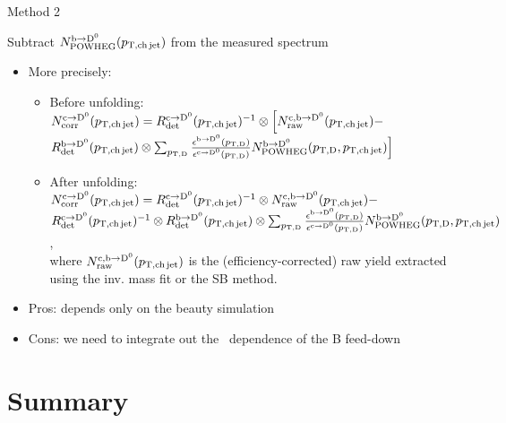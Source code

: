 \documentclass[xcolor={usenames,dvipsnames}]{beamer}
\begin{document}
\begin{frame}{Method 2}
\begin{center}
Subtract $N^{\rm b\rightarrow\mathrm{D^{0}}}_{\rm POWHEG}(p_{\mathrm{T,ch\, jet}})$ from the measured spectrum
\end{center}
\footnotesize
\begin{itemize}
\item More precisely:
\begin{itemize}
\item Before unfolding: \\
$N^{\rm c\rightarrow\mathrm{D^{0}}}_{\rm corr}(p_{\mathrm{T,ch\, jet}}) = R_{\rm det}^{\rm c\rightarrow\mathrm{D^{0}}}(p_{\mathrm{T,ch\, jet}})^{-1} \otimes \Big[N^{\rm c,b\rightarrow\mathrm{D^{0}}}_{\rm raw}(p_{\mathrm{T,ch\, jet}}) - $\\
$R_{\rm det}^{\rm b\rightarrow\mathrm{D^{0}}}(p_{\mathrm{T,ch\, jet}}) \otimes \sum_{p_{\mathrm{T,D}}} \frac{\epsilon^{\rm b\rightarrow\mathrm{D^{0}}}(p_{\mathrm{T,D}})}{\epsilon^{\rm c\rightarrow\mathrm{D^{0}}}(p_{\mathrm{T,D}})} N^{\rm b\rightarrow\mathrm{D^{0}}}_{\rm POWHEG}(p_{\mathrm{T,D}},p_{\mathrm{T,ch\, jet}})\Big]$
\item After unfolding: \\
$N^{\rm c\rightarrow\mathrm{D^{0}}}_{\rm corr}(p_{\mathrm{T,ch\, jet}}) = R_{\rm det}^{\rm c\rightarrow\mathrm{D^{0}}}(p_{\mathrm{T,ch\, jet}})^{-1} \otimes N^{\rm c,b\rightarrow\mathrm{D^{0}}}_{\rm raw}(p_{\mathrm{T,ch\, jet}}) - $ \\ 
$R_{\rm det}^{\rm c\rightarrow\mathrm{D^{0}}}(p_{\mathrm{T,ch\, jet}})^{-1} \otimes R_{\rm det}^{\rm b\rightarrow\mathrm{D^{0}}}(p_{\mathrm{T,ch\, jet}}) \otimes \sum_{p_{\mathrm{T,D}}} \frac{\epsilon^{\rm b\rightarrow\mathrm{D^{0}}}(p_{\mathrm{T,D}})}{\epsilon^{\rm c\rightarrow\mathrm{D^{0}}}(p_{\mathrm{T,D}})} N^{\rm b\rightarrow\mathrm{D^{0}}}_{\rm POWHEG}(p_{\mathrm{T,D}},p_{\mathrm{T,ch\, jet}})$, \\
where $N^{\rm c,b\rightarrow\mathrm{D^{0}}}_{\rm raw}(p_{\mathrm{T,ch\, jet}})$ is the (efficiency-corrected) raw yield extracted using the inv. mass fit or the SB method.
\end{itemize}
\item Pros: depends only on the beauty simulation
\item Cons: we need to integrate out the \ptd\ dependence of the B feed-down
\end{itemize}
\end{frame}

\section*{Summary}
\end{document}
